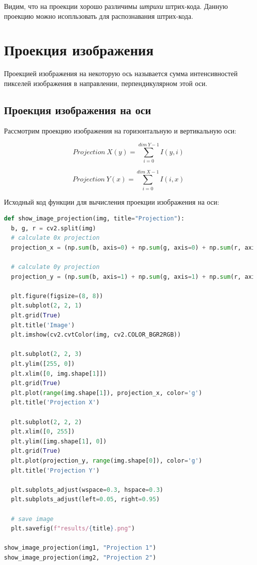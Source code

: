 \documentclass[a4paper, 12pt]{extarticle}
\begin{document}
Видим, что на проекции хорошо различимы  \textit{штрихи} штрих-кода. Данную проекцию можно исопльзовать для распознавания штрих-кода. 

\section{Проекция изображения}

Проекцией изображения на некоторую ось называется сумма интенсивностей пикселей изображения в направлении, перпендикулярном этой оси.

\subsection{Проекция изображения на оси}

Рассмотрим проекцию изображения на горизонтальную и вертикальную оси:

\begin{equation}
  Projection~X(y) = \sum\limits_{i=0}^{dim~Y - 1} I(y, i)
\end{equation}

\begin{equation}
  Projection~Y(x) = \sum\limits_{i=0}^{dim~X - 1} I(i, x)
\end{equation}

Исходный код функции для вычисления проекции изображения на оси:

\begin{lstlisting}[language=Python]
def show_image_projection(img, title="Projection"):
  b, g, r = cv2.split(img)
  # calculate 0x projection
  projection_x = (np.sum(b, axis=0) + np.sum(g, axis=0) + np.sum(r, axis=0)) / img.shape[0] / 3

  # calculate 0y projection
  projection_y = (np.sum(b, axis=1) + np.sum(g, axis=1) + np.sum(r, axis=1)) / img.shape[1] / 3

  plt.figure(figsize=(8, 8))
  plt.subplot(2, 2, 1)
  plt.grid(True)
  plt.title('Image')
  plt.imshow(cv2.cvtColor(img, cv2.COLOR_BGR2RGB))

  plt.subplot(2, 2, 3)
  plt.ylim([255, 0])
  plt.xlim([0, img.shape[1]])
  plt.grid(True)
  plt.plot(range(img.shape[1]), projection_x, color='g')
  plt.title('Projection X')

  plt.subplot(2, 2, 2)
  plt.xlim([0, 255])
  plt.ylim([img.shape[1], 0])
  plt.grid(True)
  plt.plot(projection_y, range(img.shape[0]), color='g')
  plt.title('Projection Y')

  plt.subplots_adjust(wspace=0.3, hspace=0.3)
  plt.subplots_adjust(left=0.05, right=0.95)

  # save image
  plt.savefig(f"results/{title}.png")

show_image_projection(img1, "Projection 1")
show_image_projection(img2, "Projection 2")
\end{lstlisting}
\end{document}
